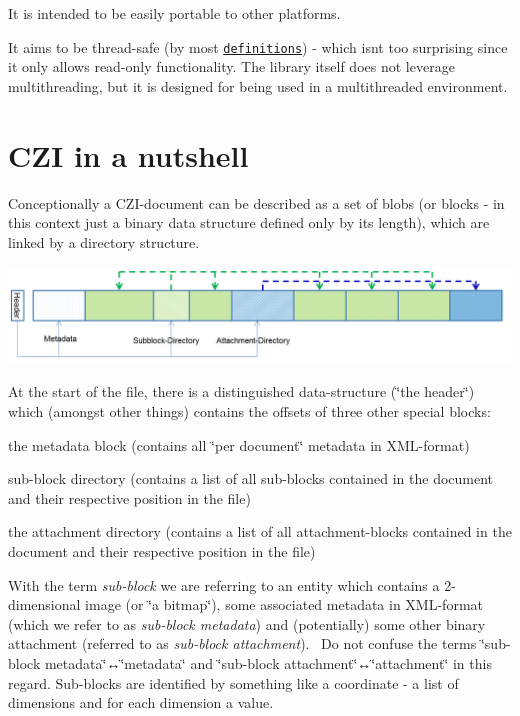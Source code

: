 It is intended to be easily portable to other platforms.

It aims to be thread-\/safe (by most \href{https://en.wikipedia.org/wiki/Thread_safety}{\tt definitions}) -\/ which isn\textquotesingle{}t too surprising since it only allows read-\/only functionality. The library itself does not leverage multithreading, but it is designed for being used in a multithreaded environment.

\section*{C\+ZI in a nutshell }

Conceptionally a C\+Z\+I-\/document can be described as a set of blobs (or blocks -\/ in this context just a binary data structure defined only by its length), which are linked by a directory structure.


\begin{DoxyImage}
\includegraphics[width=\textwidth,height=\textheight/2,keepaspectratio=true]{CZI_1.PNG}
\end{DoxyImage}
 At the start of the file, there is a distinguished data-\/structure (\char`\"{}the header\char`\"{}) which (amongst other things) contains the offsets of three other special blocks\+:


\begin{DoxyItemize}
\item the metadata block (contains all \char`\"{}per document\char`\"{} metadata in X\+M\+L-\/format)
\item sub-\/block directory (contains a list of all sub-\/blocks contained in the document and their respective position in the file)
\item the attachment directory (contains a list of all attachment-\/blocks contained in the document and their respective position in the file)
\end{DoxyItemize}

With the term {\itshape sub-\/block} we are referring to an entity which contains a 2-\/dimensional image (or \char`\"{}a bitmap\char`\"{}), some associated metadata in X\+M\+L-\/format (which we refer to as {\itshape sub-\/block metadata}) and (potentially) some other binary attachment (referred to as {\itshape sub-\/block attachment}).~\newline
Do not confuse the terms \char`\"{}sub-\/block metadata\char`\"{}↔\char`\"{}metadata\char`\"{} and \char`\"{}sub-\/block attachment\char`\"{}↔\char`\"{}attachment\char`\"{} in this regard. Sub-\/blocks are identified by something like a coordinate -\/ a list of dimensions and for each dimension a value.

